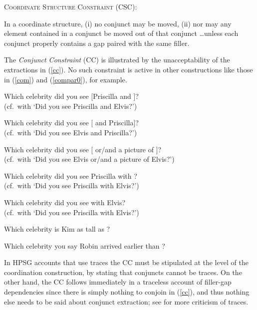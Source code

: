 \documentclass[output=paper]{langsci/langscibook}
\begin{document}
\ea 
\textsc{Coordinate Structure Constraint} (CSC):

In a coordinate structure, (i) no conjunct may be moved,
(ii) nor may any element contained in a conjunct be moved out
of that conjunct
\ldots unless each conjunct properly contains a gap paired with the same filler.
\z \label{bors}

\noindent
The {\it Conjunct Constraint} (CC) is illustrated by the unacceptability of the extractions in (\ref{cc}). No such constraint is active in other constructions like those in (\ref{com}) and (\ref{compar0}), for example. 
 

\ea\label{cc} 
\ea \bad{*}Which celebrity did you see [Priscilla and \spc]?\\
(cf.\ with `Did you see Priscilla and Elvis?')
\item  \bad{*}Which celebrity did you see  [ \spc and Priscilla]?\\
(cf.\ with `Did you see Elvis and Priscilla?')
\item \bad{*}Which celebrity did you see  [ \spc or/and a picture of \spc]?\\
(cf.\ with `Did you see Elvis or/and a picture of Elvis?')
\z 
\z

\ea  \ea Which celebrity did you see Priscilla with \spc?\\
(cf.\ with `Did you see Priscilla with Elvis?')
\item Which celebrity did you see \spc with Elvis?\\
(cf.\ with `Did you see Priscilla with Elvis?')
\z \label{com}
\z


\ea  
\ea Which celebrity  is Kim as tall as \spc?
\item Which celebrity you say Robin arrived earlier than \spc?
\z \label{compar0}
\z

\noindent
In HPSG accounts that use traces \citep{pollardsag,levhubook} the CC must be stipulated at the level of the coordination construction, by stating that conjuncts cannot be traces. On the other hand, the CC  follows immediately in a traceless account of  filler-gap dependencies  \citep{fodorsagt,bouma,ginzsag,fgsag08} since there is simply nothing to conjoin in (\ref{cc}), and thus nothing else needs to be said about conjunct extraction; see \citet{sagonline} for more criticism of  traces. 
\end{document}
